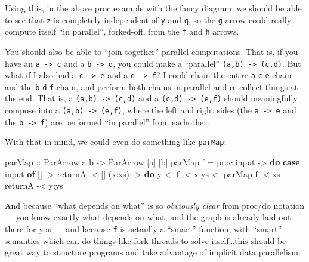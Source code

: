 \documentclass[]{article}
\newenvironment{Shaded}{}{}
\newcommand{\KeywordTok}[1]{\textcolor[rgb]{0.00,0.44,0.13}{\textbf{{#1}}}}
\newcommand{\DataTypeTok}[1]{\textcolor[rgb]{0.56,0.13,0.00}{{#1}}}
\newcommand{\OtherTok}[1]{\textcolor[rgb]{0.00,0.44,0.13}{{#1}}}
\newcommand{\FunctionTok}[1]{\textcolor[rgb]{0.02,0.16,0.49}{{#1}}}
\newcommand{\NormalTok}[1]{{#1}}
\begin{document}
Using this, in the above proc example with the fancy diagram, we should be able
to see that \texttt{z} is completely independent of \texttt{y} and \texttt{q},
so the \texttt{g} arrow could really compute itself ``in parallel'', forked-off,
from the \texttt{f} and \texttt{h} arrows.

You should also be able to ``join together'' parallel computations. That is, if
you have an \texttt{a\ -\textgreater{}\ c} and a \texttt{b\ -\textgreater{}\ d},
you could make a ``parallel'' \texttt{(a,b)\ -\textgreater{}\ (c,d)}. But what
if I also had a \texttt{c\ -\textgreater{}\ e} and a
\texttt{d\ -\textgreater{}\ f}? I could chain the entire
\texttt{a}-\texttt{c}-\texttt{e} chain and the \texttt{b}-\texttt{d}-\texttt{f}
chain, and perform both chains in parallel and re-collect things at the end.
That is, a \texttt{(a,b)\ -\textgreater{}\ (c,d)} and a
\texttt{(c,d)\ -\textgreater{}\ (e,f)} should meaningfully compose into a
\texttt{(a,b)\ -\textgreater{}\ (e,f)}, where the left and right sides (the
\texttt{a\ -\textgreater{}\ e} and the \texttt{b\ -\textgreater{}\ f}) are
performed ``in parallel'' from eachother.

With that in mind, we could even do something like \texttt{parMap}:

\begin{Shaded}
\begin{Highlighting}[]
\OtherTok{parMap ::} \DataTypeTok{ParArrow} \NormalTok{a b }\OtherTok{->} \DataTypeTok{ParArrow} \NormalTok{[a] [b]}
\NormalTok{parMap f }\FunctionTok{=} \NormalTok{proc input }\OtherTok{->} \KeywordTok{do}
    \KeywordTok{case} \NormalTok{input }\KeywordTok{of}
      \NormalTok{[]     }\OtherTok{->}
          \NormalTok{returnA        }\FunctionTok{-<} \NormalTok{[]}
      \NormalTok{(x}\FunctionTok{:}\NormalTok{xs) }\OtherTok{->} \KeywordTok{do}
          \NormalTok{y  }\OtherTok{<-} \NormalTok{f        }\FunctionTok{-<} \NormalTok{x}
          \NormalTok{ys }\OtherTok{<-} \NormalTok{parMap f }\FunctionTok{-<} \NormalTok{xs}
          \NormalTok{returnA        }\FunctionTok{-<} \NormalTok{y}\FunctionTok{:}\NormalTok{ys}
\end{Highlighting}
\end{Shaded}

And because ``what depends on what'' is so \emph{obviously clear} from proc/do
notation --- you know exactly what depends on what, and the graph is already
laid out there for you --- and because \texttt{f} is actaully a ``smart''
function, with ``smart'' semantics which can do things like fork threads to
solve itself\ldots{}this should be great way to structure programs and take
advantage of implicit data parallelism.
\end{document}
